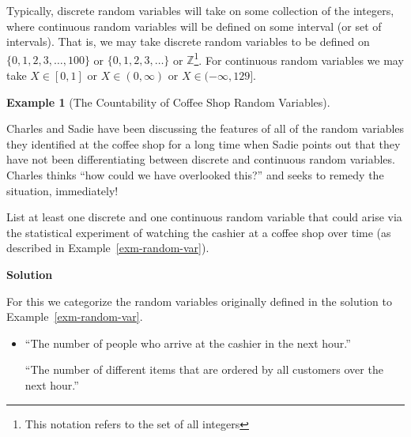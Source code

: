 \documentclass[
  letterpaper,
  DIV=11,
  numbers=noendperiod]{scrreprt}
\theoremstyle{definition}
\theoremstyle{definition}
\newtheorem{example}{Example}[chapter]
\theoremstyle{definition}
\theoremstyle{remark}
\begin{document}


Typically, discrete random variables will take on some collection of the
integers, where continuous random variables will be defined on some
interval (or set of intervals). That is, we may take discrete random
variables to be defined on \(\{0,1,2,3,\dots,100\}\) or
\(\{0,1,2,3,\dots\}\) or \(\mathbb{Z}\)\footnote{This notation refers to
  the set of all integers}. For continuous random variables we may take
\(X \in [0,1]\) or \(X \in (0,\infty)\) or \(X\in (-\infty,129]\).

\begin{example}[The Countability of Coffee Shop Random
Variables]\protect\hypertarget{exm-discrete-vs-continuous-rv}{}\label{exm-discrete-vs-continuous-rv}

Charles and Sadie have been discussing the features of all of the random
variables they identified at the coffee shop for a long time when Sadie
points out that they have not been differentiating between discrete and
continuous random variables. Charles thinks ``how could we have
overlooked this?'' and seeks to remedy the situation, immediately!

List at least one discrete and one continuous random variable that could
arise via the statistical experiment of watching the cashier at a coffee
shop over time (as described in Example~\ref{exm-random-var}).

\begin{tcolorbox}[enhanced jigsaw, colback=white, colframe=quarto-callout-color-frame, arc=.35mm, leftrule=.75mm, rightrule=.15mm, opacityback=0, breakable, bottomrule=.15mm, left=2mm, toprule=.15mm]

\vspace{-3mm}\textbf{Solution}\vspace{3mm}

For this we categorize the random variables originally defined in the
solution to Example~\ref{exm-random-var}.

\begin{itemize}
\item
  ``The number of people who arrive at the cashier in the next hour.''

  ``The number of different items that are ordered by all customers over
  the next hour.''


\end{itemize}
\end{tcolorbox}
\end{example}
\end{document}
